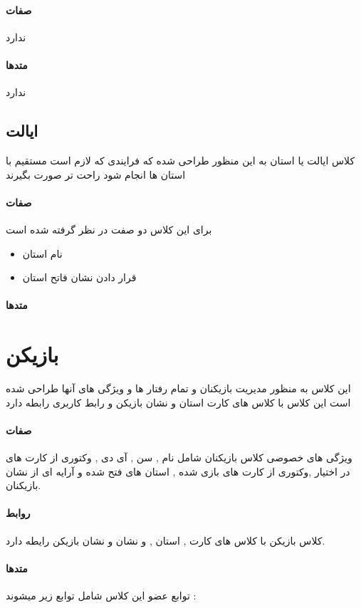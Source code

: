 \documentclass[pdf,titlepage,a4paper]{report}
\begin{document}
	\paragraph{صفات}
	ندارد
	\paragraph{متدها}
	ندارد
	
	\subsection{ایالت}
	کلاس ایالت یا استان به این منظور طراحی شده که فرایندی که لازم است مستقیم با استان ها انجام شود راحت تر صورت بگیرند 

	\paragraph{صفات}
	 برای این کلاس دو صفت در نظر گرفته شده است
	 \begin{latin}
	 	\begin{itemize}
	 		\item {} نام استان 
	 		\item {} قرار دادن نشان فاتح استان
	 	\end{itemize}
	 \end{latin}
	\paragraph{متدها}
	
	\section{بازیکن}
	این کلاس به منظور مدیریت بازیکنان و تمام رفتار ها و ویژگی های آنها طراحی شده است 
	 این کلاس با کلاس های کارت استان و نشان بازیکن و رابط کاربری رابطه دارد
	\paragraph{صفات}
	ویژگی های خصوصی کلاس بازیکنان شامل نام , سن , آی دی , وکتوری از کارت های در اختیار ,وکتوری از کارت های بازی شده , استان های فتح شده و آرایه ای از نشان بازیکنان.
	\paragraph{روابط}
	کلاس بازیکن با کلاس های کارت , استان , و نشان و نشان بازیکن رایطه دارد.\\
	
	\paragraph{متدها}
	توابع عضو این کلاس شامل توابع زیر میشوند :
	
\end{document}

